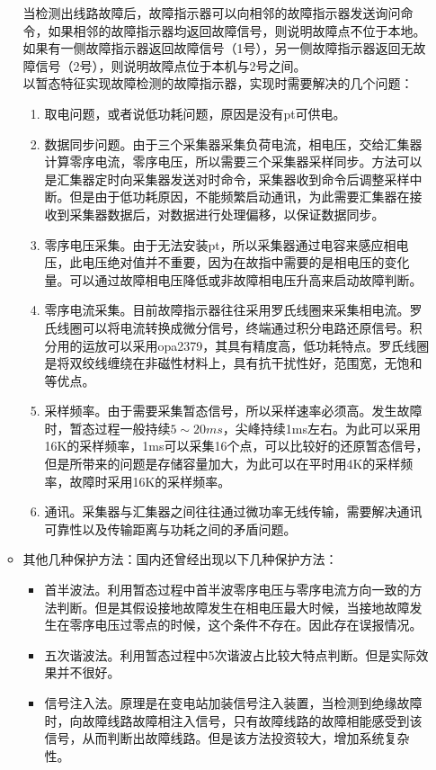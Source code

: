 \documentclass{article}
\begin{document}
\begin{CJK}{UTF8}{gbsn}
\begin{enumerate}
\begin{itemize}
				当检测出线路故障后，故障指示器可以向相邻的故障指示器发送询问命令，如果相邻的故障指示器均返回故障信号，则说明故障点不位于本地。如果有一侧故障指示器返回故障信号（1号），另一侧故障指示器返回无故障信号（2号），则说明故障点位于本机与2号之间。\\
				以暂态特征实现故障检测的故障指示器，实现时需要解决的几个问题：\
				\begin{enumerate}
				\item  取电问题，或者说低功耗问题，原因是没有pt可供电。
				\item  数据同步问题。由于三个采集器采集负荷电流，相电压，交给汇集器计算零序电流，零序电压，所以需要三个采集器采样同步。方法可以是汇集器定时向采集器发送对时命令，采集器收到命令后调整采样中断。但是由于低功耗原因，不能频繁启动通讯，为此需要汇集器在接收到采集器数据后，对数据进行处理偏移，以保证数据同步。
				\item 零序电压采集。由于无法安装pt，所以采集器通过电容来感应相电压，此电压绝对值并不重要，因为在故指中需要的是相电压的变化量。可以通过故障相电压降低或非故障相电压升高来启动故障判断。
				\item 零序电流采集。目前故障指示器往往采用罗氏线圈来采集相电流。罗氏线圈可以将电流转换成微分信号，终端通过积分电路还原信号。积分用的运放可以采用opa2379，其具有精度高，低功耗特点。罗氏线圈是将双绞线缠绕在非磁性材料上，具有抗干扰性好，范围宽，无饱和等优点。
				\item 采样频率。由于需要采集暂态信号，所以采样速率必须高。发生故障时，暂态过程一般持续$5\sim 20ms$，尖峰持续1ms左右。为此可以采用16K的采样频率，1ms可以采集16个点，可以比较好的还原暂态信号，但是所带来的问题是存储容量加大，为此可以在平时用4K的采样频率，故障时采用16K的采样频率。
				\item  通讯。采集器与汇集器之间往往通过微功率无线传输，需要解决通讯可靠性以及传输距离与功耗之间的矛盾问题。
			\end{enumerate}
		\item 其他几种保护方法：国内还曾经出现以下几种保护方法：\cite{p2}
			\begin{itemize}
					\item 首半波法。利用暂态过程中首半波零序电压与零序电流方向一致的方法判断。但是其假设接地故障发生在相电压最大时候，当接地故障发生在零序电压过零点的时候，这个条件不存在。因此存在误报情况。
					\item 五次谐波法。利用暂态过程中5次谐波占比较大特点判断。但是实际效果并不很好。
					\item 信号注入法。原理是在变电站加装信号注入装置，当检测到绝缘故障时，向故障线路故障相注入信号，只有故障线路的故障相能感受到该信号，从而判断出故障线路。但是该方法投资较大，增加系统复杂性。

\end{itemize}
\end{itemize}
\end{enumerate}
\end{CJK}
\end{document}
